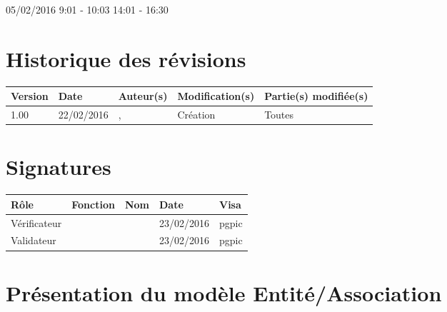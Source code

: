 \documentclass [a4paper] {article}
\begin{document}
05/02/2016			 				%
\hfill   
\hfill 	 9:01 - 10:03 	14:01 - 16:30			%


\section*{Historique des révisions}
\begin{center}
			\begin{tabular}{| p{2.5cm} | p{3cm} | p{3cm} | p{3cm} | p{3.5cm} |}
				\hline
				\rowcolor{Gray}
				Version & Date & Auteur(s) & Modification(s) & Partie(s) modifiée(s)		 \\
				\hline
				1.00 & 22/02/2016 & \Pierre, \Kafui & Création & Toutes \\
		\hline		
			\end{tabular}
		\end{center}

\section*{Signatures}

		\begin{center}
			\begin{tabular}{| p{2.5cm} | p{4cm} | p{3cm} | p{3cm} | p{2.5cm} |}
				\hline
				\rowcolor{Gray}
				Rôle & Fonction & Nom & Date & Visa		 \\
				\hline
				Vérificateur & \RGC & \Mathieu & 23/02/2016 & pgpic \\[30pt]
				\hline
				Validateur & \CP & \Sergi & 23/02/2016 & pgpic \\[30pt]	
				\hline
			\end{tabular}
		\end{center}


\section{Présentation du modèle Entité/Association}
\end{document}
